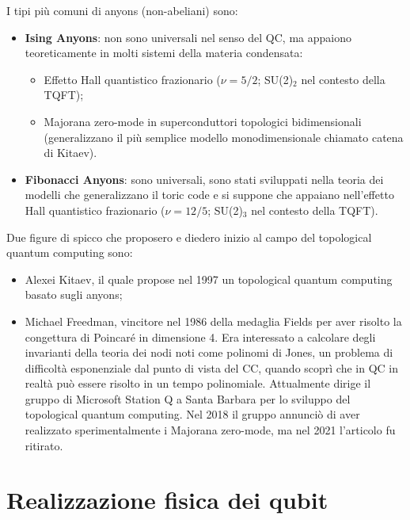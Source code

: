 \noindent I tipi più comuni di anyons (non-abeliani) sono:
\begin{itemize}
    \item \textbf{Ising Anyons}: non sono universali nel senso del QC, ma appaiono teoreticamente in molti sistemi della materia condensata:
        \begin{itemize}
            \item Effetto Hall quantistico frazionario ($\nu=5/2$; SU(2)$_2$ nel contesto della TQFT);
            \item Majorana zero-mode in superconduttori topologici bidimensionali (generalizzano il più semplice modello monodimensionale chiamato catena di Kitaev).
        \end{itemize}
    \item \textbf{Fibonacci Anyons}: sono universali, sono stati sviluppati nella teoria dei modelli che generalizzano il toric code e si suppone che appaiano nell'effetto Hall quantistico frazionario ($\nu=12/5$; SU(2)$_3$ nel contesto della TQFT).
\end{itemize}
Due figure di spicco che proposero e diedero inizio al campo del topological quantum computing sono:
\begin{itemize}
    \item Alexei Kitaev, il quale propose nel 1997 un topological quantum computing basato sugli anyons;
    \item Michael Freedman, vincitore nel 1986 della medaglia Fields per aver risolto la congettura di Poincaré in dimensione 4. Era interessato a calcolare degli invarianti della teoria dei nodi noti come polinomi di Jones,  un problema di difficoltà esponenziale dal punto di vista del CC, quando scoprì che in QC in realtà può essere risolto in un tempo polinomiale. Attualmente dirige il gruppo di Microsoft Station Q a Santa Barbara per lo sviluppo del topological quantum computing. Nel 2018 il gruppo annunciò di aver realizzato sperimentalmente i Majorana zero-mode, ma nel 2021 l'articolo fu ritirato.
\end{itemize}






\chapter{Realizzazione fisica dei qubit}

